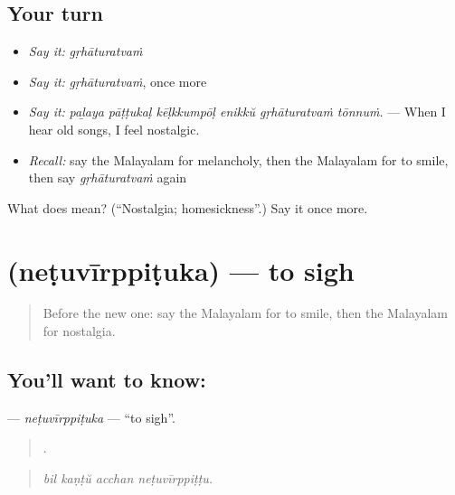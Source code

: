 \subsection*{Your turn}
\begin{itemize}
\raggedright
  \item \emph{Say it:} \emph{gṛhāturatvaṁ}
  \item \emph{Say it:} \emph{gṛhāturatvaṁ}, once more
  \item \emph{Say it:} \emph{paḻaya pāṭṭukaḷ kēḷkkumpōḷ enikkŭ gṛhāturatvaṁ tōnnuṁ.} — When I hear old songs, I feel nostalgic.
  \item \emph{Recall:} say the Malayalam for melancholy, then the Malayalam for to smile, then say \emph{gṛhāturatvaṁ} again
\end{itemize}

\begin{tcolorbox}[breakable,colback=teal!4,colframe=teal!35!black,title={Before you move on}]
What does  mean? (\textquotedblleft{}Nostalgia; homesickness\textquotedblright{}.) Say it once more.
\end{tcolorbox}
\section[\texorpdfstring{\ml{നെടുവീർപ്പിടുക} (neṭuvīrppiṭuka)}{നെടുവീർപ്പിടുക (neṭuvīrppiṭuka)}]{ (neṭuvīrppiṭuka) — to sigh}

\label{lesson:ML-C521-netuvirppituka}



\begin{quote}
Before the new one: say the Malayalam for to smile, then the Malayalam for nostalgia.
\end{quote}

\subsection*{You'll want to know: }
\textbf{} — \emph{neṭuvīrppiṭuka} — \textquotedblleft{}to sigh\textquotedblright{}.

\begin{quote}
   .
\end{quote}

\begin{quote}
\emph{bil kaṇṭŭ acchan neṭuvīrppiṭṭu.}
\end{quote}

